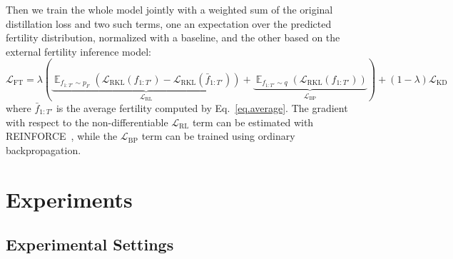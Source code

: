 \documentclass{article} %
\begin{document}
Then we train the whole model jointly with a weighted sum of the original distillation loss and two such terms, one an expectation over the predicted fertility distribution, normalized with a baseline, and the other based on the external fertility inference model:
\begin{equation}
\mathcal{L}_\text{FT} = \lambda \left(\underbrace{\mathop{\mathbb{E}}_{f_{1:T'} \sim p_F}\left(\mathcal{L}_\text{RKL}\left(f_{1:T'}\right) - \mathcal{L}_\text{RKL}\left(\bar{f}_{1:T'}\right)\right)}_{\mathcal{L}_\text{RL}} + \underbrace{\mathop{\mathbb{E}}_{f_{1:T'} \sim q}\left(\mathcal{L}_\text{RKL}\left(f_{1:T'}\right)\right)}_{\mathcal{L}_\text{BP}}\right) + (1 - \lambda)\mathcal{L}_\text{KD}
\end{equation}
where $\bar{f}_{1:T'}$ is the average fertility computed by Eq.~\ref{eq.average}.
The gradient with respect to the non-differentiable $\mathcal{L}_\text{RL}$ term can be estimated with REINFORCE~\citep{williams1992simple}, while the $\mathcal{L}_\text{BP}$ term can be trained using ordinary backpropagation.

\section{Experiments}
\subsection{Experimental Settings}
\vspace{-5pt}
\end{document}
